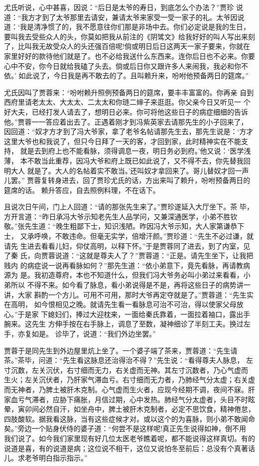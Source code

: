 尤氏听说，心中甚喜，因说：“后日是太爷的寿日，到底怎么个办法？”贾珍
说道：“我方才到了太爷那里去请安，兼请太爷来家受一受一家子的礼。太爷因说
道：‘我是清净惯了的，我不愿意往你们那是非场中去。你们必定说是我的生日，
要叫我去受些众人的头，你莫如把我从前注的《阴骘文》给我好好的叫人写出来刻
了，比叫我无故受众人的头还强百倍呢!倘或明日后日这两天一家子要来，你就在
家里好好的款待他们就是了。也不必给我送什么东西来。连你后日也不必来。你要
心中不安，你今日就给我磕了头去。倘或后日你又跟许多人来闹我，我必和你不依。’
如此说了，今日我是再不敢去的了。且叫赖升来，吩咐他预备两日的筵席。”

尤氏因叫了贾蓉来：“吩咐赖升照例预备两日的筵席，要丰丰富富的。你再亲
自到西府里请老太太、大太太、二太太和你琏二婶子来逛逛。你父亲今日又听见一
个好大夫，已经打发人请去了，想明日必来。你可将他这些日子的病症细细的告诉
他。”贾蓉一一答应着出去了。正遇着刚才到冯紫英家去请那先生的小子回来了，
因回道：“奴才方才到了冯大爷家，拿了老爷名帖请那先生去，那先生说是：‘方才
这里大爷也和我说了，但只今日拜了一天的客，才回到家，此时精神实在不能支持，
就是去到府上也不能看脉，须得调息一夜，明日务必到府。’他又说：‘医学浅薄，
本不敢当此重荐，因冯大爷和府上既已如此说了，又不得不去，你先替我回明大人
就是了。大人的名帖着实不敢当。’还叫奴才拿回来了。哥儿替奴才回一声儿罢。”
贾蓉复转身进去，回了贾珍尤氏的话，方出来叫了赖升，吩咐预备两日的筵席的话。
赖升答应，自去照例料理，不在话下。

且说次日午间，门上人回道：“请的那张先生来了。”贾珍遂延入大厅坐下。茶
毕，方开言道：“昨日承冯大爷示知老先生人品学问，又兼深通医学，小弟不胜钦
敬。”张先生道：“晚生粗鄙下士，知识浅陋。昨因冯大爷示知，大人家第谦恭下士，
又承呼唤，不敢违命。但毫无实学，倍增汗颜。”贾珍道：“先生不必过谦，就请先
生进去看看儿妇，仰仗高明，以释下怀。”于是贾蓉同了进去，到了内室，见了秦
氏，向贾蓉说道：“这就是尊夫人了？”贾蓉道：“正是。请先生坐下，让我把贱内
的病症说一说再看脉如何？”那先生道：“依小弟意下，竟先看脉，再请教病源为
是。我初造尊府，本也不知道什么，但我们冯大爷务必叫小弟过来看看，小弟所以
不得不来。如今看了脉息，看小弟说得是不是，再将这些日子的病势讲一讲，大家
斟酌一个方儿。可用不可用，那时大爷再定夺就是了。”贾蓉道：“先生实在高明，
如今恨相见之晚。就请先生看一看脉息可治不可治，得以使家父母放心。”于是家
下媳妇们，捧过大迎枕来，一面给秦氏靠着，一面拉着袖口，露出手腕来。这先生
方伸手按在右手脉上，调息了至数，凝神细诊了半刻工夫。换过左手，亦复如是。
诊毕了，说道：“我们外边坐罢。”

贾蓉于是同先生到外边屋里炕上坐了。一个婆子端了茶来，贾蓉道：“先生请
茶。”茶毕，问道：“先生看这脉息还治得治不得？”先生说：“看得尊夫人脉息，
左寸沉数，左关沉伏，右寸细而无力，右关虚而无神。其左寸沉数者，乃心气虚而
生火；左关沉伏者，乃肝家气滞血亏。右寸细而无力者，乃肺经气分太虚；右关虚
而无神者，乃脾土被肝木克制。心气虚而生火者，应现今经期不调，夜间不寐。肝
家血亏气滞者，应胁下痛胀，月信过期，心中发热。肺经气分太虚者，头目不时眩
晕，寅卯间必然自汗，如坐舟中，脾土被肝木克制者，必定不思饮食，精神倦怠，
四肢酸软。据我看这脉，当有这些症候才对。或以这个的为喜脉，则小弟不敢闻命
矣。”旁边一个贴身伏侍的婆子道：“何尝不是这样呢!真正先生说得如神，倒不用
我们说了。如今我们家里现有好几位太医老爷瞧着呢，都不能说得这样真切。有的
说道是喜，有的说道是病；这位说不相干，这位又说怕冬至前后：总没有个真著话
儿。求老爷明白指示指示。”

